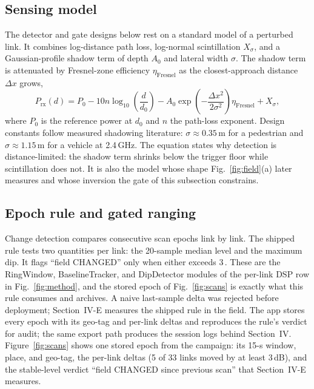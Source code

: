 \documentclass[conference,10pt]{IEEEtran}
\newcommand{\dB}{\text{dB}}
\begin{document}
\subsection{Sensing model}
The detector and gate designs below rest on a standard model of a perturbed link. It combines log-distance path loss, log-normal scintillation $X_\sigma$, and a Gaussian-profile shadow term of depth $A_0$ and lateral width $\sigma$. The shadow term is attenuated by Fresnel-zone efficiency $\eta_{\mathrm{Fresnel}}$ as the closest-approach distance $\Delta x$ grows,
{\small
\begin{equation}
P_{\mathrm{rx}}(d) = P_0 - 10n \log_{10}\!\left(\frac{d}{d_0}\right) - A_0 \exp\!\left(-\frac{\Delta x^2}{2\sigma^2}\right)\! \eta_{\mathrm{Fresnel}} + X_\sigma ,
\label{eq:pathloss}
\end{equation}}
where $P_0$ is the reference power at $d_0$ and $n$ the path-loss exponent.
Design constants follow measured shadowing literature: $\sigma \approx
0.35$\,m for a pedestrian and $\sigma \approx 1.15$\,m for a vehicle at
2.4\,GHz. The equation states why detection is distance-limited: the shadow
term shrinks below the trigger floor while scintillation does not. It is also
the model whose shape Fig.~\ref{fig:field}(a) later measures and whose
inversion the gate of this subsection constrains.

\subsection{Epoch rule and gated ranging}
Change detection compares consecutive scan epochs link by link. The shipped
rule tests two quantities per link: the 20-sample median level and the
maximum dip. It flags ``field CHANGED'' only when either exceeds 3\,\dB. These are the RingWindow, BaselineTracker, and DipDetector modules of the per-link DSP row in Fig.~\ref{fig:method}, and the stored epoch of Fig.~\ref{fig:scans} is exactly what this rule consumes and archives. A naive last-sample
delta was rejected before deployment; Section~IV-E measures the shipped rule
in the field. The app stores every epoch with its geo-tag and per-link deltas and reproduces the rule's verdict for audit; the same export path produces the session logs behind Section~IV. Figure~\ref{fig:scans} shows one stored epoch from the campaign: its 15-s window, place, and geo-tag, the per-link deltas (5 of 33 links moved by at least 3\,dB), and the stable-level verdict ``field CHANGED since previous scan'' that Section~IV-E measures.
\end{document}
